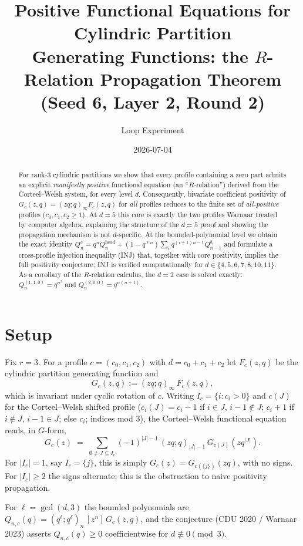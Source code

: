 \documentclass[11pt]{article}
\title{Positive Functional Equations for Cylindric Partition\\
Generating Functions: the $R$-Relation Propagation Theorem\\
{\large (Seed 6, Layer 2, Round 2)}}
\author{Loop Experiment}
\date{2026-07-04}
\theoremstyle{definition}
\begin{document}
\maketitle

\begin{abstract}
For rank-3 cylindric partitions we show that every profile containing a zero part
admits an explicit \emph{manifestly positive} functional equation (an ``$R$-relation'')
derived from the Corteel--Welsh system, for every level $d$. Consequently, bivariate
coefficient positivity of $G_c(z,q)=(zq;q)_\infty F_c(z,q)$ for \emph{all} profiles
reduces to the finite set of \emph{all-positive} profiles ($c_0,c_1,c_2\ge 1$).
At $d=5$ this core is exactly the two profiles Warnaar treated by computer algebra,
explaining the structure of the $d=5$ proof and showing the propagation mechanism is
not $d$-specific. At the bounded-polynomial level we obtain the exact identity
$Q_n^c = q^n Q_n^{\mathrm{head}} + (1-q^{\ell n})\sum_i q^{(i+1)n-1}Q_{n-1}^{b_i}$
and formulate a cross-profile injection inequality (INJ) that, together with core
positivity, implies the full positivity conjecture; INJ is verified computationally
for $d\in\{4,5,6,7,8,10,11\}$. As a corollary of the $R$-relation calculus, the $d=2$
case is solved exactly: $Q_n^{(1,1,0)}=q^{n^2}$ and $Q_n^{(2,0,0)}=q^{n(n+1)}$.
\end{abstract}

\section{Setup}

Fix $r=3$. For a profile $c=(c_0,c_1,c_2)$ with $d=c_0+c_1+c_2$ let $F_c(z,q)$ be the
cylindric partition generating function and
\[
G_c(z,q) := (zq;q)_\infty\, F_c(z,q),
\]
which is invariant under cyclic rotation of $c$. Writing $I_c=\{i: c_i>0\}$ and $c(J)$
for the Corteel--Welsh shifted profile ($c_i(J)=c_i-1$ if $i\in J,\,i-1\notin J$;
$c_i+1$ if $i\notin J,\,i-1\in J$; else $c_i$; indices mod $3$), the Corteel--Welsh
functional equation reads, in $G$-form,
\begin{equation}\label{eq:CW}
G_c(z) \;=\; \sum_{\emptyset \ne J\subseteq I_c} (-1)^{|J|-1}\,(zq;q)_{|J|-1}\,
G_{c(J)}(zq^{|J|}).
\end{equation}
For $|I_c|=1$, say $I_c=\{j\}$, this is simply $G_c(z)=G_{c(\{j\})}(zq)$, with no signs.
For $|I_c|\ge 2$ the signs alternate; this is the obstruction to naive positivity
propagation.

For $\ell=\gcd(d,3)$ the bounded polynomials are
$Q_{n,c}(q) = (q^\ell;q^\ell)_n\,[z^n]\,G_c(z,q)$, and the conjecture (CDU 2020 /
Warnaar 2023) asserts $Q_{n,c}(q)\ge 0$ coefficientwise for $d\not\equiv 0 \pmod 3$.
\end{document}
